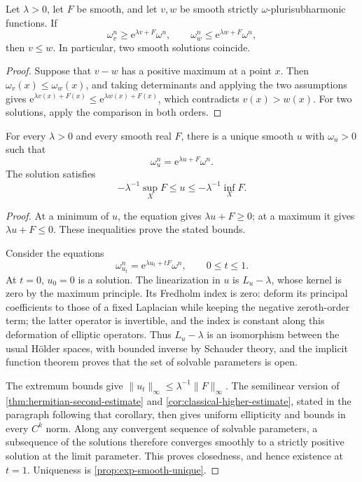\begin{proposition}\label{prop:smooth-proper-comparison}\label{prop:exp-smooth-unique}
Let $\lambda>0$, let $F$ be smooth, and let $v,w$ be smooth strictly $\omega$-plurisubharmonic functions. If
\[
 \omega_v^n\geq \mathrm{e}^{\lambda v+F}\omega^n,
 \qquad \omega_w^n\leq \mathrm{e}^{\lambda w+F}\omega^n,
\]
then $v\leq w$. In particular, two smooth solutions coincide.
\end{proposition}
\begin{proof}
Suppose that $v-w$ has a positive maximum at a point $x$. Then $\omega_v(x)\leq\omega_w(x)$, and taking determinants and applying the two assumptions gives
$\mathrm{e}^{\lambda v(x)+F(x)}\leq \mathrm{e}^{\lambda w(x)+F(x)}$, which contradicts $v(x)>w(x)$. For two solutions, apply the comparison in both orders.
\end{proof}

\begin{theorem}\label{thm:smooth-proper-existence}
For every $\lambda>0$ and every smooth real $F$, there is a unique smooth $u$ with $\omega_u>0$ such that
\[
 \omega_u^n=\mathrm{e}^{\lambda u+F}\omega^n.
\]
The solution satisfies
\[
 -\lambda^{-1}\sup_XF\leq u\leq-\lambda^{-1}\inf_XF.
\]
\end{theorem}
\begin{proof}
At a minimum of $u$, the equation gives $\lambda u+F\geq0$; at a maximum it gives $\lambda u+F\leq0$. These inequalities prove the stated bounds.

Consider the equations
\[
 \omega_{u_t}^n=\mathrm{e}^{\lambda u_t+tF}\omega^n,\qquad0\leq t\leq1.
\]
At $t=0$, $u_0=0$ is a solution. The linearization in $u$ is $L_u-\lambda$, whose kernel is zero by the maximum principle. Its Fredholm index is zero: deform its principal coefficients to those of a fixed Laplacian while keeping the negative zeroth-order term; the latter operator is invertible, and the index is constant along this deformation of elliptic operators. Thus $L_u-\lambda$ is an isomorphism between the usual H\"older spaces, with bounded inverse by Schauder theory, and the implicit function theorem proves that the set of solvable parameters is open.

The extremum bounds give $\|u_t\|_\infty\leq\lambda^{-1}\|F\|_\infty$. The semilinear version of \cref{thm:hermitian-second-estimate} and \cref{cor:classical-higher-estimate}, stated in the paragraph following that corollary, then gives uniform ellipticity and bounds in every $C^k$ norm. Along any convergent sequence of solvable parameters, a subsequence of the solutions therefore converges smoothly to a strictly positive solution at the limit parameter. This proves closedness, and hence existence at $t=1$. Uniqueness is \cref{prop:exp-smooth-unique}.
\end{proof}

